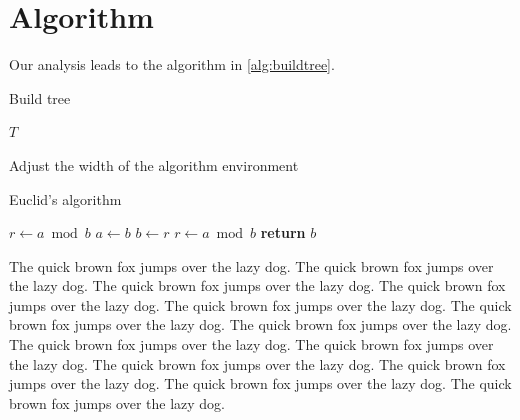 \documentclass[openany,twoside,12pt]{book}
\theoremstyle{plain}
\numberwithin{equation}{chapter}
\numberwithin{figure}{chapter}
\numberwithin{table}{chapter}
\begin{document}
\section{Algorithm}
\label{sec:alg}

Our analysis leads to the algorithm in \ref{alg:buildtree}.

\begin{algorithm}
\caption{Build tree}
\label{alg:buildtree}
\begin{algorithmic}
  \EndWhile
  \State \Return $T$
\end{algorithmic}
\end{algorithm}

\clearpage
Adjust the width of the algorithm environment
\begin{center}
\vspace{-2ex}
\begin{minipage}{0.9\linewidth}
\begin{algorithm}[H]
\caption{Euclid’s algorithm}
\label{alg:euclid}
\begin{algorithmic}[1] %
  \State $r \gets a \bmod b$
    \State $a \gets b$
    \State $b \gets r$
    \State $r \gets a \bmod b$
  \EndWhile\label{euclidendwhile}
  \State \textbf{return} $b$
\EndProcedure
\end{algorithmic}
\end{algorithm}
\end{minipage}
\end{center}


The quick brown fox jumps over the lazy dog. The quick brown fox jumps over the lazy dog. The quick brown fox jumps over the lazy dog. The quick brown fox jumps over the lazy dog. The quick brown fox jumps over the lazy dog. The quick brown fox jumps over the lazy dog. The quick brown fox jumps over the lazy dog. The quick brown fox jumps over the lazy dog. The quick brown fox jumps over the lazy dog. The quick brown fox jumps over the lazy dog. The quick brown fox jumps over the lazy dog. The quick brown fox jumps over the lazy dog. The quick brown fox jumps over the lazy dog.
\end{document}
